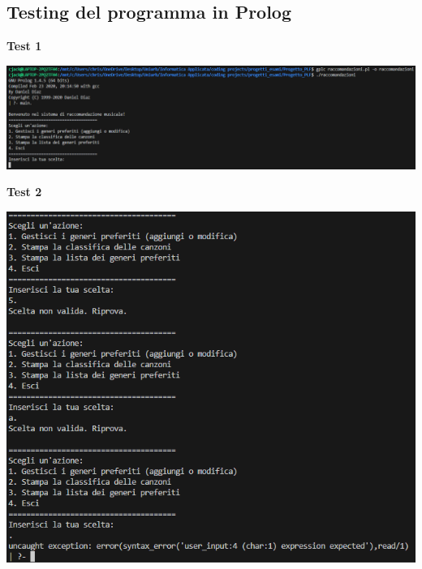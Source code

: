 \documentclass[a4paper,11pt]{article}
\begin{document}
    \subsection{Testing del programma in Prolog}
    \begin{center}
        \textbf{Test 1}
        \par
        \vspace{0.5cm}
        \includegraphics[width=1\textwidth]{Immagini/Tests/ptest1}
    \end{center}
    \begin{center}
        \textbf{Test 2}
        \par
        \vspace{0.5cm}
        \includegraphics[width=1\textwidth]{Immagini/Tests/ptest2}
    \end{center}
\end{document}
